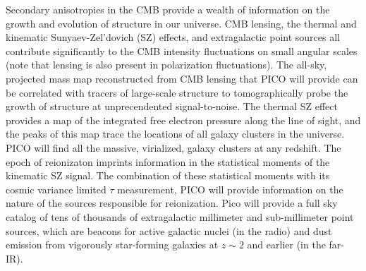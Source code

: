 \documentclass[PICOReport.tex]{subfiles}
\begin{document}
  Secondary anisotropies in the CMB provide
a wealth of information on the growth and evolution of structure in our universe.
CMB lensing, the thermal and kinematic Sunyaev-Zel'dovich (SZ)
effects, and extragalactic point sources all contribute significantly
to the CMB intensity fluctuations on small angular scales (note that
lensing is also present in polarization fluctuations). The all-sky,
projected mass map reconstructed from CMB lensing that PICO will
provide can be correlated with tracers of large-scale structure to
tomographically probe the growth of structure at unprecendented
signal-to-noise. The thermal SZ effect provides a map of the
integrated free electron pressure along the line of sight, and the
peaks of this map trace the locations of all galaxy clusters in the
universe. PICO will find all the massive, virialized, galaxy clusters
at any redshift.  The epoch of reionizaton imprints information in the
statistical moments of the kinematic SZ signal.  The combination of
these statistical moments with its cosmic variance limited $\tau$
measurement, PICO will provide information on the nature of the
sources responsible for reionization.
Pico will provide a full sky catalog of tens of thousands of
extragalactic millimeter and sub-millimeter point sources, which are
beacons for active galactic nuclei (in the radio) and dust emission
from vigorously star-forming galaxies at $z \sim 2$ and earlier (in
the far-IR).

\end{document}
